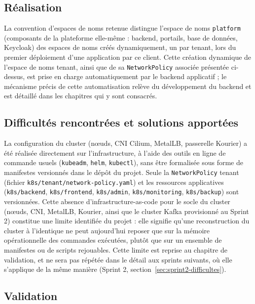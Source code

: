 \subsection{Réalisation}

La convention d'espaces de noms retenue distingue l'espace de noms \texttt{platform} (composants de la plateforme elle-même : backend, portails, base de données, Keycloak) des espaces de noms créés dynamiquement, un par tenant, lors du premier déploiement d'une application par ce client. Cette création dynamique de l'espace de noms tenant, ainsi que de sa \texttt{NetworkPolicy} associée présentée ci-dessus, est prise en charge automatiquement par le backend applicatif ; le mécanisme précis de cette automatisation relève du développement du backend et est détaillé dans les chapitres qui y sont consacrés.

\subsection{Difficultés rencontrées et solutions apportées}
\label{sec:sprint0-difficultes}

La configuration du cluster (nœuds, CNI Cilium, MetalLB, passerelle Kourier) a été réalisée directement sur l'infrastructure, à l'aide des outils en ligne de commande usuels (\texttt{kubeadm}, \texttt{helm}, \texttt{kubectl}), sans être formalisée sous forme de manifestes versionnés dans le dépôt du projet. Seule la \texttt{NetworkPolicy} tenant (fichier \texttt{k8s/tenant/network-policy.yaml}) et les ressources applicatives (\texttt{k8s/backend}, \texttt{k8s/frontend}, \texttt{k8s/admin}, \texttt{k8s/monitoring}, \texttt{k8s/backup}) sont versionnées. Cette absence d'infrastructure-as-code pour le socle du cluster (nœuds, CNI, MetalLB, Kourier, ainsi que le cluster Kafka provisionné au Sprint 2) constitue une limite identifiée du projet : elle signifie qu'une reconstruction du cluster à l'identique ne peut aujourd'hui reposer que sur la mémoire opérationnelle des commandes exécutées, plutôt que sur un ensemble de manifestes ou de scripts rejouables. Cette limite est reprise au chapitre de validation, et ne sera pas répétée dans le détail aux sprints suivants, où elle s'applique de la même manière (Sprint 2, section~\ref{sec:sprint2-difficultes}).

\subsection{Validation}

